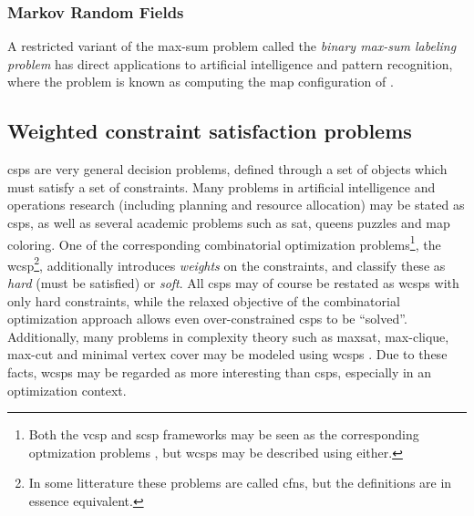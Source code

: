
\subsubsection{Markov Random Fields}
A restricted variant of the max-sum problem called the \emph{binary max-sum labeling problem} has direct applications to artificial intelligence and pattern recognition, where the problem is known as computing the \gls{map} configuration of  \parencite[\pno~1165]{Werner07}.


\subsection{Weighted constraint satisfaction problems}
\Glspl{csp} are very general decision problems, defined through a set of objects which must satisfy a set of constraints.
Many problems in artificial intelligence and operations research (including planning and resource allocation) may be stated as \glspl{csp}, as well as several academic problems such as \gls{sat}, queens puzzles and map coloring.
One of the corresponding combinatorial optimization problems\footnote{Both the \gls{vcsp} and \gls{scsp} frameworks may be seen as the corresponding optmization problems \parencites{Meseguer06}{Bistarelli99}, but \glspl{wcsp} may be described using either.}, the \gls{wcsp}\footnote{In some litterature these problems are called \glspl{cfn}, but the definitions are in essence equivalent.}, additionally introduces \emph{weights} on the constraints, and classify these as \emph{hard} (must be satisfied) or \emph{soft}.
All \glspl{csp} may of course be restated as \glspl{wcsp} with only hard constraints, while the relaxed objective of the combinatorial optimization approach allows even over-constrained \glspl{csp} to be \enquote{solved}.
Additionally, many problems in complexity theory such as \gls{maxsat}, max-clique, max-cut and minimal vertex cover may be modeled using \glspl{wcsp} \parencite[\pno~315]{Meseguer06}.
Due to these facts, \glspl{wcsp} may be regarded as more interesting than \glspl{csp}, especially in an optimization context.

